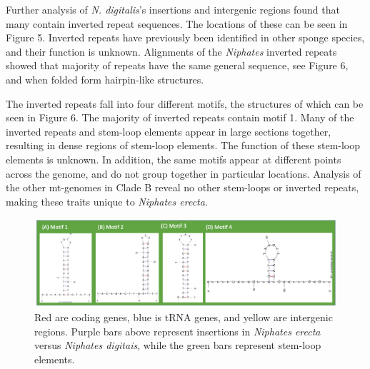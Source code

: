 \documentclass[../main.tex]{subfiles}
\begin{document}
Further analysis of \emph{N. digitalis}'s insertions and intergenic regions found that many contain inverted repeat sequences. The locations of these can be seen in Figure 5. Inverted repeats have previously been identified in other sponge species, and their function is unknown. Alignments of the \emph{Niphates} inverted repeats showed that majority of repeats have the same general sequence, see Figure 6, and when folded form hairpin-like structures.

The inverted repeats fall into four different motifs, the structures of which can be seen in Figure 6. The majority of inverted repeats contain motif 1. 
Many of the inverted repeats and stem-loop elements appear in large sections together, resulting in dense regions of stem-loop elements. The function of these stem-loop elements is unknown. In addition, the same motifs appear at different points across the genome, and do not group together in particular locations. Analysis of the other mt-genomes in Clade B reveal no other stem-loops or inverted repeats, making these traits unique to \emph{Niphates erecta}.

\begin{figure}[htp]
    \centering
    \includegraphics[width=1.0\textwidth]{Figures/figure 6.png}
    \caption{Red are coding genes, blue is tRNA genes, and yellow are intergenic regions. Purple bars above represent insertions in \emph{Niphates erecta} versus \emph{Niphates digitais}, while the green bars represent stem-loop elements.}
\end{figure}
\end{document}
